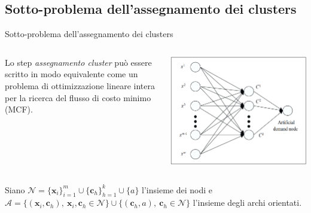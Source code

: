 \documentclass{beamer}
\begin{document}
\subsection{Sotto-problema dell'assegnamento dei clusters}
\begin{frame}{Sotto-problema dell'assegnamento dei clusters}
	\begin{columns}
		\begin{column}{0.5\textwidth}
			Lo step \textit{assegnamento cluster} può essere scritto in modo equivalente come un problema di ottimizzazione lineare intera per la ricerca del flusso di costo minimo (MCF).  
		\end{column}
		\begin{column}{0.5\textwidth}
			\begin{center}
				\includegraphics[width=1\textwidth]{MCF.png}      
			\end{center}
		\end{column}
	\end{columns}
	\vspace{0.3cm}
	Siano $\mathcal{N} = \{\textbf{x}_i\}_{i=1}^m \cup \{\textbf{c}_h\}_{h=1}^k \cup \{a\}$ l'insieme dei nodi e $\mathcal{A} = \{(\textbf{x}_i,\textbf{c}_h), \ \textbf{x}_i,\textbf{c}_h \in \mathcal{N}\} \cup \{(\textbf{c}_h, a), \ \textbf{c}_h \in \mathcal{N}\}$ l'insieme degli archi orientati. 	
\end{frame}
\end{document}
